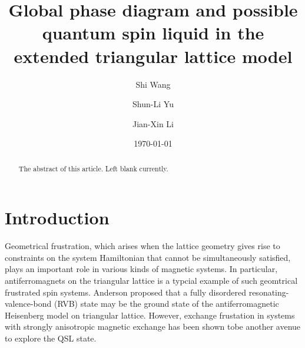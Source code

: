 \documentclass[aps,prb,reprint,groupedaddress,showpacs,amsfonts,amsmath,amssymb,superscriptaddress]{revtex4-1}
\begin{document}
\title{Global phase diagram and possible quantum spin liquid in the extended triangular lattice model}

\author{Shi Wang}
\author{Shun-Li Yu}
\author{Jian-Xin Li}

\date{\today}

\begin{abstract}
The abstract of this article. Left blank currently.
\end{abstract}

\maketitle

\section{Introduction}
Geometrical frustration, which arises when the lattice geometry gives rise to constraints on the system Hamiltonian that cannot be simultaneously satisfied, plays an important role in various kinds of magnetic systems. In particular, antiferromagnets on the triangular lattice is a typcial example of such geomtrical frustrated spin systems. Anderson proposed that a fully disordered resonating-valence-bond (RVB) state may be the ground state of the antiferromagnetic Heisenberg model on triangular lattice. However, exchange frustation in systems with strongly anisotropic magnetic exchange has been shown  tobe another avenue to explore the QSL state.
\end{document}
